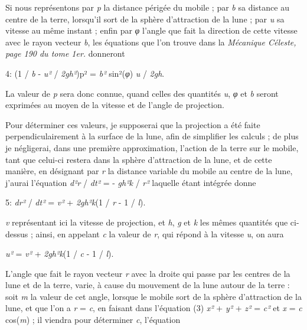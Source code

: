 \documentclass[a4paper, 11pt, oneside, polutonikogreek, french]{article}
\begin{document}
Si nous représentons par \emph{p} la distance périgée du mobile ; par \emph{b} sa distance au centre de la terre, lorsqu'il sort de la sphère d'attraction de la lune ; par \emph{u} sa vitesse au même instant ; enfin par \emph{φ} l'angle que fait la direction de cette vitesse avec le rayon vecteur \emph{b}, les équations que l'on trouve dans la \emph{Mécanique Céleste, page 190 du tome 1er.} donneront

\begin{center}
4: (1 / \emph{b} - \emph{u²} / \emph{2gh²})p² = \emph{b²} sin²(\emph{φ}) \emph{u} / \emph{2gh}.
\end{center}

La valeur de \emph{p} sera donc connue, quand celles des quantités \emph{u}, \emph{φ} et \emph{b} seront exprimées au moyen de la vitesse et de l'angle de projection.

Pour déterminer ces valeurs, je supposerai que la projection a été faite perpendiculairement à la surface de la lune, afin de simplifier les calculs ; de plus je négligerai, dans une première approximation, l'action de la terre sur le mobile, tant que celui-ci restera dans la sphère d'attraction de la lune, et de cette manière, en désignant par \emph{r} la distance variable du mobile au centre de la lune, j'aurai l'équation \emph{d²r} / \emph{dt²} = - \emph{gh²k} / \emph{r²} laquelle étant intégrée donne

\begin{center}
5: \emph{dr²} / \emph{dt²} = \emph{v²} + \emph{2gh²k}(1 / \emph{r} - 1 / \emph{l}).
\end{center}

\emph{v} représentant ici la vitesse de projection, et \emph{h}, \emph{g} et \emph{k} les mêmes quantités que ci-dessus ; ainsi, en appelant \emph{c} la valeur de \emph{r}, qui répond à la vitesse \emph{u}, on aura

\begin{center}
\emph{u²} = \emph{v²} + \emph{2gh²k}(1 / \emph{c} - 1 / \emph{l}).
\end{center}

L'angle que fait le rayon vecteur \emph{r} avec la droite qui passe par les centres de la lune et de la terre, varie, à cause du mouvement de la lune autour de la terre : soit \emph{m} la valeur de cet angle, lorsque le mobile sort de la sphère d'attraction de la lune, et que l'on a \emph{r} = \emph{c}, en faisant dans l'équation (3) \emph{x²} + \emph{y²} + \emph{z²} = \emph{c²} et \emph{x} = \emph{c} cos(\emph{m}) ; il viendra pour déterminer \emph{c}, l'équation
\end{document}
